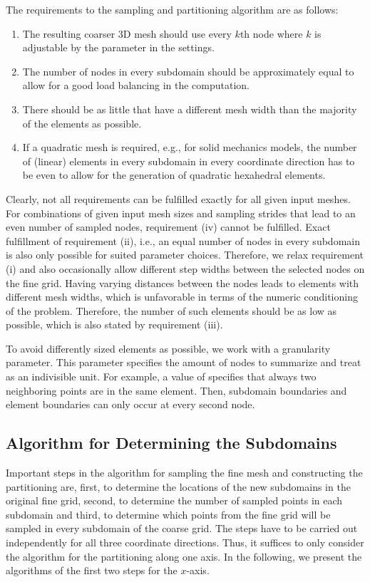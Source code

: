 The requirements to the sampling and partitioning algorithm are as follows: 
\begin{enumerate}[label=(\roman*)]
\item The resulting coarser 3D mesh should use every $k$th node where $k$ is adjustable by the parameter  in the settings.
\item The number of nodes in every subdomain should be approximately equal to allow for a good load balancing in the computation.
\item There should be as little  that have a different mesh width than the majority of the elements as possible.
\item If a quadratic mesh is required, e.g., for solid mechanics models, the number of (linear) elements in every subdomain in every coordinate direction has to be even to allow for the generation of quadratic hexahedral elements.
\end{enumerate}

Clearly, not all requirements can be fulfilled exactly for all given input meshes. For combinations of given input mesh sizes and sampling strides that lead to an even number of sampled nodes, requirement (iv) cannot be fulfilled. 
Exact fulfillment of requirement (ii), i.e., an equal number of nodes in every subdomain is also only possible for suited parameter choices. Therefore, we relax requirement (i) and also occasionally allow different step widths between the selected nodes on the fine grid. Having varying distances between the nodes leads to elements with different mesh widths, which is unfavorable in terms of the numeric conditioning of the problem. Therefore, the number of such elements should be as low as possible, which is also stated by requirement (iii).

To avoid differently sized elements as possible, we work with a granularity parameter. This parameter specifies the amount of nodes to summarize and treat as an indivisible unit. For example, a value of  specifies that always two neighboring points are in the same element. Then, subdomain boundaries and element boundaries can only occur at every second node.

\subsection{Algorithm for Determining the Subdomains}\label{sec:partitioning_alg1}

Important steps in the algorithm for sampling the fine mesh and constructing the partitioning are, first, to determine the locations of the new subdomains in the original fine grid, second, to determine the number of sampled points in each subdomain and third, to determine which points from the fine grid will be sampled in every subdomain of the coarse grid. The steps have to be carried out independently for all three coordinate directions. Thus, it suffices to only consider the algorithm for the partitioning along one axis.
In the following, we present the algorithms of the first two steps for the $x$-axis. 

